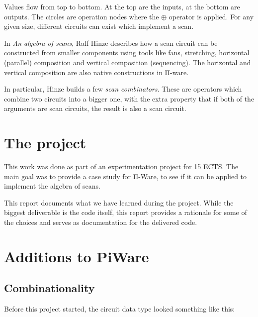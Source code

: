 
Values flow from top to bottom.
At the top are the inputs, at the bottom are outputs.
The circles are operation nodes where the $\oplus$ operator is
applied.
For any given size, different circuits can exist which implement a scan.

In \emph{An algebra of scans}, Ralf Hinze describes how a scan circuit
can be constructed from smaller components using tools like
fans, stretching, horizontal (parallel) composition and vertical
composition (sequencing).
The horizontal and vertical composition are also native constructions
in Π-ware.

In particular, Hinze builds a few \emph{scan combinators}.
These are operators which combine two circuits into a bigger one, with
the extra property that if both of the arguments are scan circuits,
the result is also a scan circuit.

\section{The project}\label{The-project}

This work was done as part of an experimentation project for 15 ECTS.
The main goal was to provide a case study for Π-Ware, to see if it can
be applied to implement the algebra of scans.

This report documents what we have learned during the project.
While the biggest deliverable is the code itself, this report provides
a rationale for some of the choices and serves as documentation for
the delivered code.

\section{Additions to PiWare}\label{additions-to-piware}

\subsection{Combinationality}\label{combinationality}

Before this project started, the circuit data type  looked
something like this:


